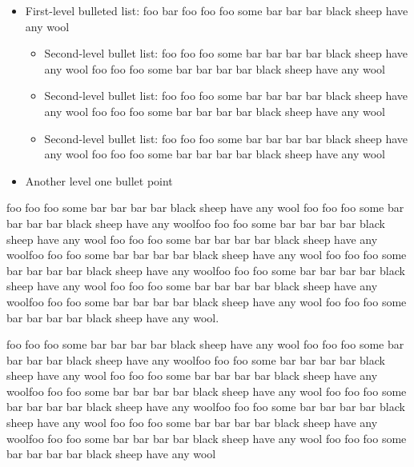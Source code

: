 \documentclass{sis-dc}
\theoremstyle{definition}
\begin{document}
\begin{itemize}
    \item First-level bulleted list: foo bar foo foo foo some bar bar bar black sheep have any wool
    \begin{itemize}
        \item Second-level bullet list: foo foo foo some bar bar bar bar black sheep have any wool foo foo foo some bar bar bar bar black sheep have any wool
        \item Second-level bullet list: foo foo foo some bar bar bar bar black sheep have any wool foo foo foo some bar bar bar bar black sheep have any wool
        \item Second-level bullet list: foo foo foo some bar bar bar bar black sheep have any wool foo foo foo some bar bar bar bar black sheep have any wool
    \end{itemize}
    \item Another level one bullet point
\end{itemize}

foo foo foo some bar bar bar bar black sheep have any wool foo foo foo some bar bar bar bar black sheep have any woolfoo foo foo some bar bar bar bar black sheep have any wool foo foo foo some bar bar bar bar black sheep have any woolfoo foo foo some bar bar bar bar 
black sheep have any wool foo foo foo some bar bar bar bar black sheep have any woolfoo foo foo some bar bar bar bar black sheep have any wool foo foo foo some bar bar bar bar black sheep have any woolfoo foo foo some bar bar bar bar black sheep have any wool foo foo foo 
some bar bar bar bar black sheep have any wool.

foo foo foo some bar bar bar bar black sheep have any wool foo foo foo some bar bar bar bar black sheep have any woolfoo foo foo some bar bar bar bar black sheep have any wool foo foo foo some bar bar bar bar black sheep have any woolfoo foo foo some bar bar bar bar 
black sheep have any wool foo foo foo some bar bar bar bar black sheep have any woolfoo foo foo some bar bar bar bar black sheep have any wool foo foo foo some bar bar bar bar black sheep have any woolfoo foo foo some bar bar bar bar black sheep have any wool foo foo foo 
some bar bar bar bar black sheep have any wool


\end{document}

